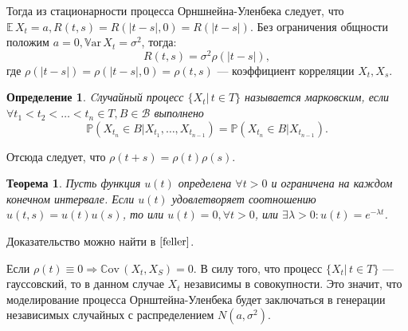 \documentclass[oneside, final, 12pt]{article}
\def\Var{{\mathbb{V}\textrm{ar}}\,}
\def\E{{\mathbb{E} }\,}
\def\Cov{{\mathbb{C}\textrm{ov}}\,}
\newtheorem{theorem}{Теорема}
\newtheorem{definition}{Определение}
\begin{document}
	Тогда из стационарности процесса Орншнейна-Уленбека следует,  что 
	$\E X_t = a, R(t,s)= R(|t-s|,0) =R(|t-s|)$.
	Без ограничения общности положим $a=0, \Var X_t = \sigma^2$, тогда:
	$$
		R(t,s) = \sigma^2 \rho(|t-s|), 
	$$
	где $\rho(|t-s|)=\rho(|t-s|,0)= \rho(t,s)$ --- коэффициент корреляции $X_t,X_s$.
	\newpage
	\begin{definition}
		Cлучайный процесс $\{X_t |\, t\in T\}$ называется марковским, если 
		$\forall t_1<t_2<\ldots<t_n \in T, B \in \mathcal{B}$ выполнено
		$$\mathbb{P}(X_{t_n} \in B | X_{t_1}, \ldots, X_{t_{n-1}}) = \mathbb{P}(X_{t_n} \in B | X_{t_{n-1}}).$$
	\end{definition}
	Отсюда следует, что $\rho(t+s)=\rho(t)\rho(s)$.
	\begin{theorem}
		Пусть функция $u(t)$ определена $\forall t > 0$ и ограничена на каждом конечном
		интервале. Если $u(t)$ удовлетворяет соотношению $u(t,s)=u(t)u(s)$, то или $u(t)=0, \forall t>0$,
		или $\exists \lambda > 0: u(t) = e^{-\lambda t}$.
	\end{theorem}
	Доказательство можно найти в $\cite{feller}$.
	\newline
	
	Если 	$\rho(t) \equiv 0 \Rightarrow \Cov (X_t,X_S) = 0$. 
	\newline В силу того, что процесс $\{X_t|\,t\in T\}$ --- гауссовский,
	то в данном случае $X_t$ независимы в совокупности. Это значит, что моделирование процесса 
	Орнштейна-Уленбека будет заключаться в генерации независимых случайных с распределением 
	$N(a,\sigma^2).$
	\newline
	
\end{document}
